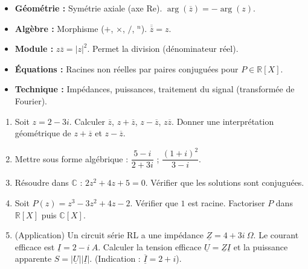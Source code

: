 \documentclass[11pt]{article}
\begin{document}
\begin{aretenir}
\begin{itemize}
    \item \textbf{Géométrie :} Symétrie axiale (axe Re). $\arg(\overline{z}) = -\arg(z)$.
    \item \textbf{Algèbre :} Morphisme ($+$, $\times$, $/$, $^n$). $\overline{\overline{z}}=z$.
    \item \textbf{Module :} $z\overline{z} = |z|^2$. Permet la division (dénominateur réel).
    \item \textbf{Équations :} Racines non réelles par paires conjuguées pour $P \in \mathbb{R}[X]$.
    \item \textbf{Technique :} Impédances, puissances, traitement du signal (transformée de Fourier).
\end{itemize}
\end{aretenir}

\begin{exercice}
\begin{enumerate}
    \item Soit $z = 2 - 3i$. Calculer $\overline{z}$, $z+\overline{z}$, $z-\overline{z}$, $z\overline{z}$. Donner une interprétation géométrique de $z+\overline{z}$ et $z-\overline{z}$.
    \item Mettre sous forme algébrique : $\dfrac{5-i}{2+3i}$ ; $\dfrac{(1+i)^2}{3-i}$.
    \item Résoudre dans $\mathbb{C}$ : $2z^2 + 4z + 5 = 0$. Vérifier que les solutions sont conjuguées.
    \item Soit $P(z) = z^3 - 3z^2 + 4z - 2$. Vérifier que $1$ est racine. Factoriser $P$ dans $\mathbb{R}[X]$ puis $\mathbb{C}[X]$.
    \item (Application) Un circuit série RL a une impédance $\underline{Z} = 4 + 3i \ \Omega$. Le courant efficace est $\underline{I} = 2 - i \ A$. Calculer la tension efficace $\underline{U} = \underline{Z}\underline{I}$ et la puissance apparente $S = |\underline{U}||\underline{I}|$. (Indication : $\overline{\underline{I}} = 2+i$).
\end{enumerate}
\end{exercice}
\end{document}

